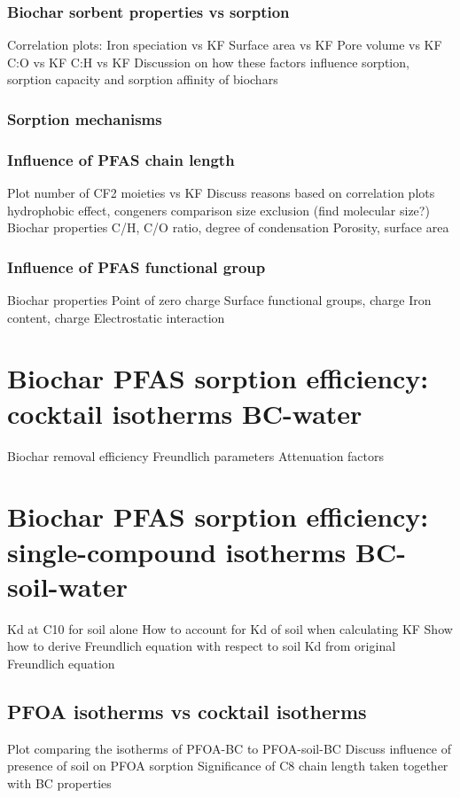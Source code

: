 \subsubsection{Biochar sorbent properties vs sorption}
Correlation plots:
    Iron speciation vs KF
    Surface area vs KF 
    Pore volume vs KF 
    C:O vs KF 
    C:H vs KF  
Discussion on how these factors influence sorption, sorption capacity and sorption affinity of biochars

\subsubsection{Sorption mechanisms}

\subsubsection{Influence of PFAS chain length}
Plot number of CF2 moieties vs KF 
Discuss reasons based on correlation plots
    hydrophobic effect, congeners comparison
    size exclusion (find molecular size?)
    Biochar properties
        C/H, C/O ratio, degree of condensation
        Porosity, surface area

\subsubsection{Influence of PFAS functional group}
Biochar properties
    Point of zero charge
    Surface functional groups, charge
    Iron content, charge
    Electrostatic interaction

\section{Biochar PFAS sorption efficiency: cocktail isotherms BC-water}
Biochar removal efficiency 
Freundlich parameters
Attenuation factors

\section{Biochar PFAS sorption efficiency: single-compound isotherms BC-soil-water}
Kd at C10 for soil alone
How to account for Kd of soil when calculating KF 
    Show how to derive Freundlich equation with respect to soil Kd from original Freundlich equation
    
\subsection{PFOA isotherms vs cocktail isotherms}
Plot comparing the isotherms of PFOA-BC to PFOA-soil-BC
Discuss influence of presence of soil on PFOA sorption
Significance of C8 chain length taken together with BC properties 

